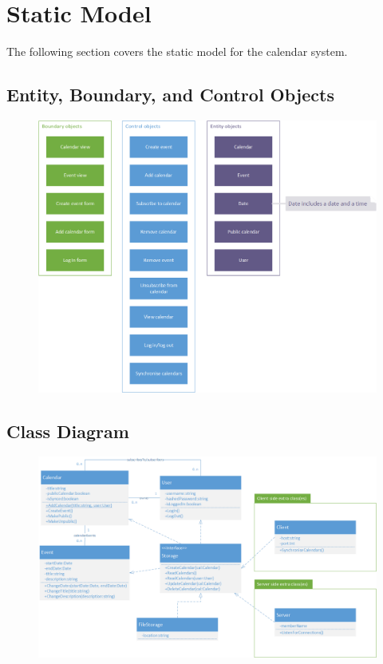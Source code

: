 \section{Static Model}
The following section covers the static model for the calendar system.

\subsection{Entity, Boundary, and Control Objects}
\begin{figure}[h]
\includegraphics[scale=0.8]{entity-boundary-control.png}
\end{figure}

\subsection{Class Diagram}
\begin{figure}[h]
\includegraphics[scale=0.6]{class.png}
\end{figure}
\clearpage